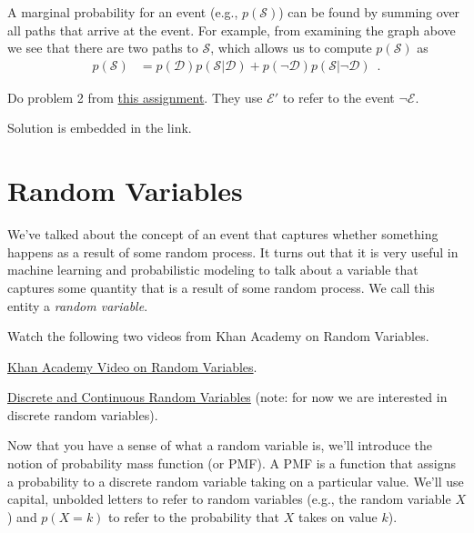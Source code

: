 \documentclass[assignment01_Solutions]{subfiles}
\begin{document}
A marginal probability for an event (e.g., $p(\mathcal{S})$) can be found by summing over all paths that arrive at the event.  For example, from examining the graph above we see that there are two paths to $\mathcal{S}$, which allows us to compute $p(\mathcal{S})$ as
\begin{align}
p(\mathcal{S}) &= p(\mathcal{D}) p(\mathcal{S}|\mathcal{D}) + p(\neg \mathcal{D}) p(\mathcal{S}|\neg \mathcal{D})  \enspace .
\end{align}


\begin{exercise}[(20 minutes)]
Do problem 2 from \href{http://wwwf.imperial.ac.uk/~atw/Bayes.pdf}{this assignment}.  They use $\mathcal{E}'$ to refer to the event $\neg \mathcal{E}$.
\begin{boxedsolution}
Solution is embedded in the link.
\end{boxedsolution}
\end{exercise}

\section{Random Variables}

We've talked about the concept of an event that captures whether something happens as a result of some random process.  It turns out that it is very useful in machine learning and probabilistic modeling to talk about a variable that captures some quantity that is a result of some random process.  We call this entity a \emph{random variable}.

\begin{externalresources}[(20 minutes)]
Watch the following two videos from Khan Academy on Random Variables.
\bi
\item \href{https://www.khanacademy.org/math/statistics-probability/random-variables-stats-library/random-variables-discrete/v/random-variables}{Khan Academy Video on Random Variables}.
\item \href{https://www.khanacademy.org/math/statistics-probability/random-variables-stats-library/random-variables-discrete/v/discrete-and-continuous-random-variables}{Discrete and Continuous Random Variables} (note: for now we are interested in discrete random variables).
\ei
\end{externalresources}

Now that you have a sense of what a random variable is, we'll introduce the notion of probability mass function (or PMF).  A PMF is a function that assigns a probability to a discrete random variable taking on a particular value.  We'll use capital, unbolded letters to refer to random variables (e.g., the random variable $X$) and $p(X = k)$ to refer to the probability that $X$ takes on value $k$).
\end{document}
